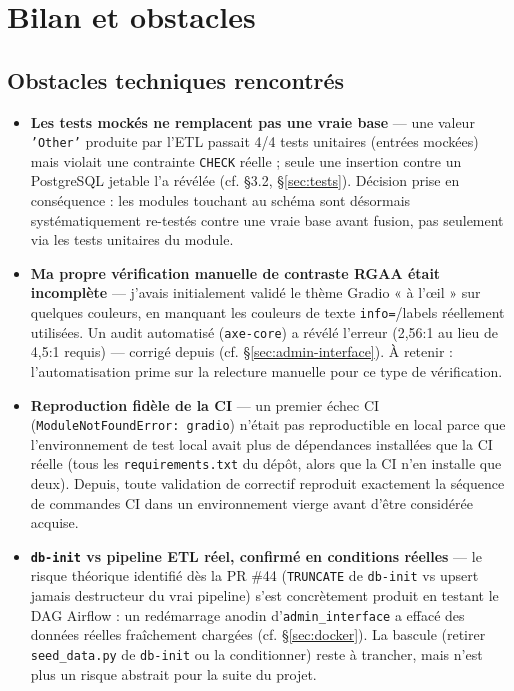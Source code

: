 \documentclass{article}
\begin{document}
\section{Bilan et obstacles}

\subsection{Obstacles techniques rencontrés}

\begin{itemize}[leftmargin=1.4em]
  \item \textbf{Les tests mockés ne remplacent pas une vraie base} — une valeur \texttt{'Other'} produite par l'ETL passait 4/4 tests unitaires (entrées mockées) mais violait une contrainte \texttt{CHECK} réelle ; seule une insertion contre un PostgreSQL jetable l'a révélée (cf. \S3.2, \S\ref{sec:tests}). Décision prise en conséquence : les modules touchant au schéma sont désormais systématiquement re-testés contre une vraie base avant fusion, pas seulement via les tests unitaires du module.
  \item \textbf{Ma propre vérification manuelle de contraste RGAA était incomplète} — j'avais initialement validé le thème Gradio « à l'œil » sur quelques couleurs, en manquant les couleurs de texte \texttt{info=}/labels réellement utilisées. Un audit automatisé (\texttt{axe-core}) a révélé l'erreur (2,56:1 au lieu de 4,5:1 requis) — corrigé depuis (cf. \S\ref{sec:admin-interface}). À retenir : l'automatisation prime sur la relecture manuelle pour ce type de vérification.
  \item \textbf{Reproduction fidèle de la CI} — un premier échec CI (\texttt{ModuleNotFoundError: gradio}) n'était pas reproductible en local parce que l'environnement de test local avait plus de dépendances installées que la CI réelle (tous les \texttt{requirements.txt} du dépôt, alors que la CI n'en installe que deux). Depuis, toute validation de correctif reproduit exactement la séquence de commandes CI dans un environnement vierge avant d'être considérée acquise.
  \item \textbf{\texttt{db-init} vs pipeline ETL réel, confirmé en conditions réelles} — le risque théorique identifié dès la PR \#44 (\texttt{TRUNCATE} de \texttt{db-init} vs upsert jamais destructeur du vrai pipeline) s'est concrètement produit en testant le DAG Airflow : un redémarrage anodin d'\texttt{admin\_interface} a effacé des données réelles fraîchement chargées (cf. \S\ref{sec:docker}). La bascule (retirer \texttt{seed\_data.py} de \texttt{db-init} ou la conditionner) reste à trancher, mais n'est plus un risque abstrait pour la suite du projet.

\end{itemize}
\end{document}
